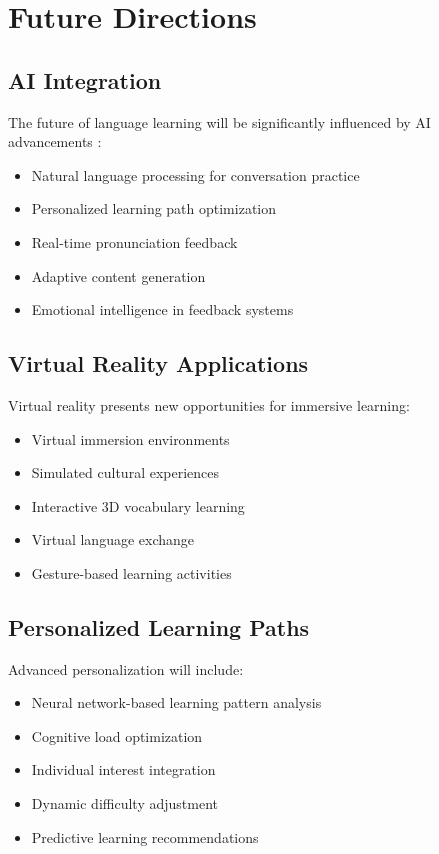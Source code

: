 \section{Future Directions}
\subsection{AI Integration}
The future of language learning will be significantly influenced by AI advancements \citep{ai2023language}:
\begin{itemize}
    \item Natural language processing for conversation practice
    \item Personalized learning path optimization
    \item Real-time pronunciation feedback
    \item Adaptive content generation
    \item Emotional intelligence in feedback systems
\end{itemize}

\subsection{Virtual Reality Applications}
Virtual reality presents new opportunities for immersive learning:
\begin{itemize}
    \item Virtual immersion environments
    \item Simulated cultural experiences
    \item Interactive 3D vocabulary learning
    \item Virtual language exchange
    \item Gesture-based learning activities
\end{itemize}

\subsection{Personalized Learning Paths}
Advanced personalization will include:
\begin{itemize}
    \item Neural network-based learning pattern analysis
    \item Cognitive load optimization
    \item Individual interest integration
    \item Dynamic difficulty adjustment
    \item Predictive learning recommendations
\end{itemize}

